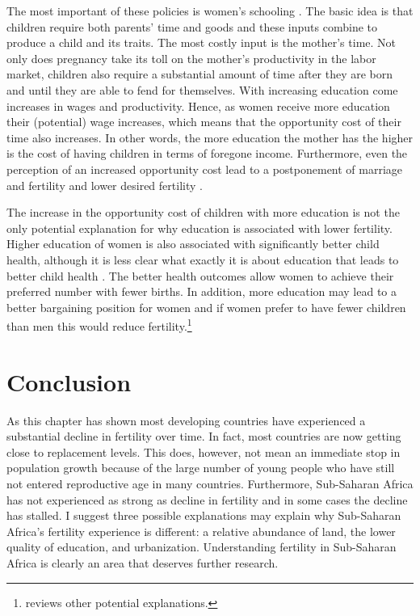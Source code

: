 The most important of these policies is women's schooling \citep{schultz02}. The basic idea is that children require both parents' time and goods and these inputs combine to produce a child and its traits. The most costly input is the mother's time. Not only does pregnancy take its toll on the mother's productivity in the labor market, children also require a substantial amount of time after they are born and until they are able to fend for themselves. With increasing education come increases in wages and productivity. Hence, as women receive more education their (potential) wage increases, which means that the opportunity cost of their time also increases. In other words, the more education the mother has the higher is the cost of having children in terms of foregone income. Furthermore, even the perception of an increased opportunity cost lead to a postponement of marriage and fertility and lower desired fertility \citep{Jensen2012}.

The increase in the opportunity cost of children with more education is not the only potential explanation for why education is associated with lower fertility. Higher education of women is also associated with significantly better child health, although it is less clear what exactly it is about education that leads to better child health \citep{Thomas1991,Glewwe1999,Kovsted2002}. The better health outcomes allow women to achieve their preferred number with fewer births. In addition, more education may lead to a better bargaining position for women and if women prefer to have fewer children than men this would reduce fertility.\footnote{\citet{Ainsworth1996} reviews other potential explanations.}

\section{Conclusion}\label{conclusion}

As this chapter has shown most developing countries have experienced a substantial decline in fertility over time. In fact, most countries are now getting close to replacement levels. This does, however, not mean an immediate stop in population growth because of the large number of young people who have still not entered reproductive age in many countries. Furthermore, Sub-Saharan Africa has not experienced as strong as decline in fertility and in some cases the decline has stalled. I suggest three possible explanations may explain why Sub-Saharan Africa's fertility experience is different: a relative abundance of land, the lower quality of education, and urbanization. Understanding fertility in Sub-Saharan Africa is clearly an area that deserves further research.

